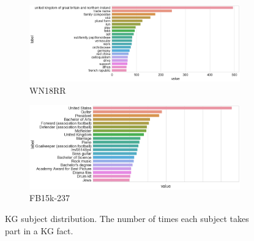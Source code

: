 
\begin{figure}[H]
	\begin{subfigure}[b]{.5\linewidth}
   		\centering
    		\includegraphics[width=1.0\linewidth, height=0.7\linewidth]{WN18RR_Subject_Counts}
		\captionsetup{justification=centering}
		\caption{WN18RR}
	\end{subfigure}
	\begin{subfigure}[b]{.5\linewidth}
   		\centering
		\includegraphics[width=1.0\linewidth, height=0.7\linewidth]{FB15k-237_Subject_Counts}
		\captionsetup{justification=centering}
		\caption{FB15k-237}
	\end{subfigure}
	\captionsetup{justification=centering}
	\caption{KG subject distribution. The number of times each subject takes part in a KG fact.}
\end{figure}

